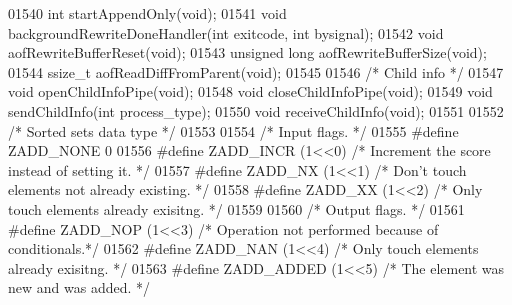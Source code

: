 \begin{DoxyCode}
{{{{{{{01540 \textcolor{keywordtype}{int} startAppendOnly(\textcolor{keywordtype}{void});
01541 \textcolor{keywordtype}{void} backgroundRewriteDoneHandler(\textcolor{keywordtype}{int} exitcode, \textcolor{keywordtype}{int} bysignal);
01542 \textcolor{keywordtype}{void} aofRewriteBufferReset(\textcolor{keywordtype}{void});
01543 \textcolor{keywordtype}{unsigned} \textcolor{keywordtype}{long} aofRewriteBufferSize(\textcolor{keywordtype}{void});
01544 ssize\_t aofReadDiffFromParent(\textcolor{keywordtype}{void});
01545 
01546 \textcolor{comment}{/* Child info */}
01547 \textcolor{keywordtype}{void} openChildInfoPipe(\textcolor{keywordtype}{void});
01548 \textcolor{keywordtype}{void} closeChildInfoPipe(\textcolor{keywordtype}{void});
01549 \textcolor{keywordtype}{void} sendChildInfo(\textcolor{keywordtype}{int} process\_type);
01550 \textcolor{keywordtype}{void} receiveChildInfo(\textcolor{keywordtype}{void});
01551 
01552 \textcolor{comment}{/* Sorted sets data type */}
01553 
01554 \textcolor{comment}{/* Input flags. */}
01555 \textcolor{preprocessor}{#}\textcolor{preprocessor}{define} \textcolor{preprocessor}{ZADD\_NONE} 0
01556 \textcolor{preprocessor}{#}\textcolor{preprocessor}{define} \textcolor{preprocessor}{ZADD\_INCR} \textcolor{preprocessor}{(}1\textcolor{preprocessor}{<<}0\textcolor{preprocessor}{)}    \textcolor{comment}{/* Increment the score instead of setting it. */}
01557 \textcolor{preprocessor}{#}\textcolor{preprocessor}{define} \textcolor{preprocessor}{ZADD\_NX} \textcolor{preprocessor}{(}1\textcolor{preprocessor}{<<}1\textcolor{preprocessor}{)}      \textcolor{comment}{/* Don't touch elements not already existing. */}
01558 \textcolor{preprocessor}{#}\textcolor{preprocessor}{define} \textcolor{preprocessor}{ZADD\_XX} \textcolor{preprocessor}{(}1\textcolor{preprocessor}{<<}2\textcolor{preprocessor}{)}      \textcolor{comment}{/* Only touch elements already exisitng. */}
01559 
01560 \textcolor{comment}{/* Output flags. */}
01561 \textcolor{preprocessor}{#}\textcolor{preprocessor}{define} \textcolor{preprocessor}{ZADD\_NOP} \textcolor{preprocessor}{(}1\textcolor{preprocessor}{<<}3\textcolor{preprocessor}{)}     \textcolor{comment}{/* Operation not performed because of conditionals.*/}
01562 \textcolor{preprocessor}{#}\textcolor{preprocessor}{define} \textcolor{preprocessor}{ZADD\_NAN} \textcolor{preprocessor}{(}1\textcolor{preprocessor}{<<}4\textcolor{preprocessor}{)}     \textcolor{comment}{/* Only touch elements already exisitng. */}
01563 \textcolor{preprocessor}{#}\textcolor{preprocessor}{define} \textcolor{preprocessor}{ZADD\_ADDED} \textcolor{preprocessor}{(}1\textcolor{preprocessor}{<<}5\textcolor{preprocessor}{)}   \textcolor{comment}{/* The element was new and was added. */}
}}}}}}}
\end{DoxyCode}

